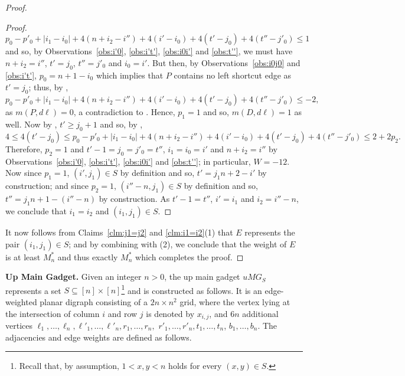 \documentclass[a4paper,11pt]{article}
\theoremstyle{plain}
\newtheorem{identification rule}{Identification Rule}
\theoremstyle{definition}
\theoremstyle{remark}
\newenvironment{claimproof}{\begin{proof}\renewcommand{\qedsymbol}{\claimqed}}{\end{proof}\renewcommand{\qedsymbol}{\plainqed}}
\let\plainqed\qedsymbol
\newcommand{\claimqed}{$\lrcorner$}
\begin{document}
\begin{proof}
\begin{claimproof}
\[
 p_0 - p'_0 + |i_1-i_0| + 4(n+i_2-i'') + 4(i'-i_0) + 4(t'-j_0) + 4(t''-j'_0) \leq 1
\]
and so, by Observations~\ref{obs:i'0}, \ref{obs:i't'}, \ref{obs:i0i'} and \ref{obs:t''}, we must have $n+i_2 = i''$, $t' = j_0$, $t'' = j'_0$ and $i_0 = i'$. But then, by Observations~\ref{obs:i0j0} and \ref{obs:i't'}, $p_0 = n+1-i_0$ which implies that $P$ contains no left shortcut edge as $t'=j_0$; thus, by ,  
\[
 p_0 - p'_0 + |i_1-i_0| + 4(n+i_2-i'') + 4(i'-i_0) + 4(t'-j_0) + 4(t''-j'_0) \leq -2,
\]
as $m(P,d\ell) = 0$, a contradiction to . Hence, $p_1 = 1$ and so, $m(D,d\ell) = 1$ as well. Now by , $t' \geq j_0+1$ and so, by ,
\[
4 \leq 4(t'-j_0) \leq p_0 - p'_0 + |i_1-i_0| + 4(n+i_2-i'') + 4(i'-i_0)+ 4(t'-j_0) + 4(t''-j'_0) \leq 2 + 2p_2.
\]
Therefore, $p_2 = 1$ and $t'-1=j_0=j'_0=t''$, $i_1=i_0=i'$ and $n+i_2=i''$ by Observations~\ref{obs:i'0}, \ref{obs:i't'}, \ref{obs:i0i'} and \ref{obs:t''}; in particular, $W = -12$. Now since $p_1 = 1$, $(i',j_1) \in S$ by definition and so, $t' = j_1n+2 - i'$ by construction; and since $p_2 = 1$, $(i''-n,j_1) \in S$ by definition and so, $t''= j_1n+1-(i''-n)$ by construction. As $t' -1 = t''$, $i' = i_1$ and $i_2 = i''-n$, we conclude that $i_1 = i_2$ and $(i_1,j_1) \in S$. 
\end{claimproof}

It now follows from Claims~\ref{clm:j1=j2} and \ref{clm:i1=i2}(1) that $E$ represents the pair $(i_1,j_1) \in S$; and by combining  with (2), we conclude that the weight of $E$ is at least $M_n^*$ and thus exactly $M_n^*$ which completes the proof.
\end{proof}


\noindent
\textbf{Up Main Gadget.} Given an integer $n > 0$, the up main gadget $uMG_S$ represents a set $S \subseteq [n] \times [n]$\footnote{Recall that, by assumption, $1 < x,y< n$ holds for every $(x,y) \in S$.} and is constructed as follows. It is an edge-weighted planar digraph consisting of a $2n \times n^2$ grid, where the vertex lying at the intersection of column $i$ and row $j$ is denoted by $x_{i,j}$, and $6n$ additional vertices $\ell_1,\ldots,\ell_n,\ell'_1,\ldots,\ell'_n,r_1,\ldots,r_n,$ $r'_1,\ldots,r'_n,t_1,\ldots,t_n$, $b_1,\ldots,b_n$. The adjacencies and edge weights are defined as follows. 
\end{document}
